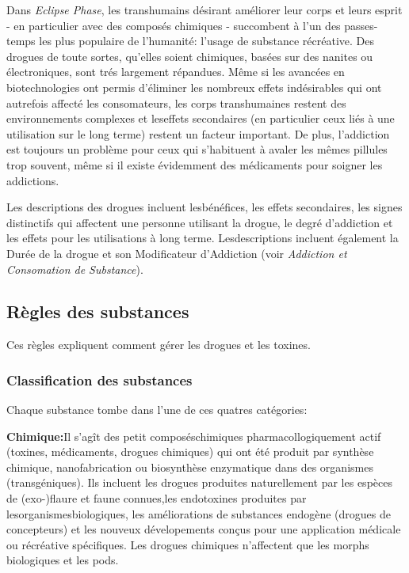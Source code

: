 Dans \emph{Eclipse Phase}, les transhumains désirant améliorer leur corps et leurs esprit - en particulier avec des composés chimiques - succombent à l'un des passes-temps les plus populaire de l'humanité: l'usage de substance récréative. Des drogues de toute sortes, qu'elles soient chimiques, basées sur des nanites ou électroniques, sont trés largement répandues. Même si les avancées en biotechnologies ont permis d'éliminer les nombreux effets indésirables qui ont autrefois affecté les consomateurs, les corps transhumaines restent des environnements complexes et leseffets secondaires (en particulier ceux liés à une utilisation sur le long terme) restent un facteur important. De plus, l'addiction est toujours un problème pour ceux qui s'habituent à avaler les mêmes pillules trop souvent, même si il existe évidemment des médicaments pour soigner les addictions. 

Les descriptions des drogues incluent lesbénéfices, les effets secondaires, les signes distinctifs qui affectent une personne utilisant la drogue, le degré d'addiction et les effets pour les utilisations à long terme. Lesdescriptions incluent également la Durée de la drogue et son Modificateur d'Addiction (voir \emph{Addiction et Consomation de Substance}). 

\subsection{Règles des substances} \label{sec:substance-rules} 

Ces règles expliquent comment gérer les drogues et les toxines. 

\subsubsection{Classification des substances} 

Chaque substance tombe dans l'une de ces quatres catégories: 

\textbf{Chimique:}Il s'agît des petit composéschimiques pharmacollogiquement actif (toxines, médicaments, drogues chimiques) qui ont été produit par synthèse chimique, nanofabrication ou biosynthèse enzymatique dans des organismes (transgéniques). Ils incluent les drogues produites naturellement par les espèces de (exo-)flaure et faune connues,les endotoxines produites par lesorganismesbiologiques, les améliorations de substances endogène (drogues de concepteurs) et les nouveux dévelopements conçus pour une application médicale ou récréative spécifiques. Les drogues chimiques n'affectent que les morphs biologiques et les pods. 

